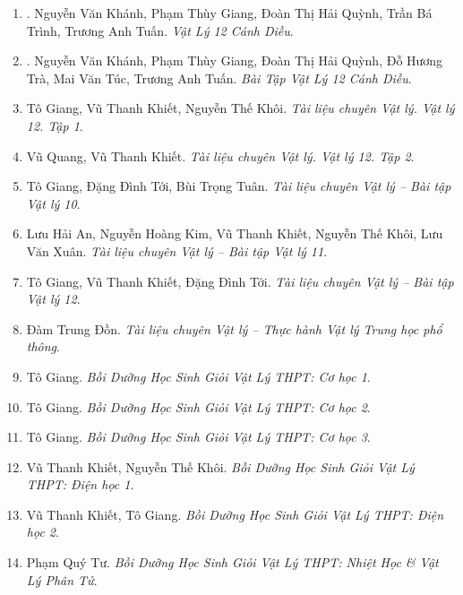 \documentclass{article}
\begin{document}
\begin{enumerate}
	\item \cite{SGK_Vat_Ly_12_CD}. {\sc Nguyễn Văn Khánh, Phạm Thùy Giang, Đoàn Thị Hải Quỳnh, Trần Bá Trình, Trương Anh Tuấn}. {\it Vật Lý 12 Cánh Diều}.\hfill{\sf[done]}

	\item \cite{SBT_Vat_Ly_12_CD}. {\sc Nguyễn Văn Khánh, Phạm Thùy Giang, Đoàn Thị Hải Quỳnh, Đỗ Hương Trà, Mai Văn Túc, Trương Anh Tuấn}. {\it Bài Tập Vật Lý 12 Cánh Diều}.\hfill{\sf[done]}

	\item Tô Giang, Vũ Thanh Khiết, Nguyễn Thế Khôi. {\it Tài liệu chuyên Vật lý. Vật lý 12. Tập 1}.

	\item Vũ Quang, Vũ Thanh Khiết. {\it Tài liệu chuyên Vật lý. Vật lý 12. Tập 2}.

	\item Tô Giang, Đặng Đình Tới, Bùi Trọng Tuân. {\it Tài liệu chuyên Vật lý -- Bài tập Vật lý 10}.

	\item Lưu Hải An, Nguyễn Hoàng Kim, Vũ Thanh Khiết, Nguyễn Thế Khôi, Lưu Văn Xuân. {\it Tài liệu chuyên Vật lý -- Bài tập Vật lý 11}.

	\item Tô Giang, Vũ Thanh Khiết, Đặng Đình Tới. {\it Tài liệu chuyên Vật lý -- Bài tập Vật lý 12}.

	\item Đàm Trung Đồn. {\it Tài liệu chuyên Vật lý -- Thực hành Vật lý Trung học phổ thông}.

	\item Tô Giang. {\it Bồi Dưỡng Học Sinh Giỏi Vật Lý THPT: Cơ học 1}.\hfill{\sf[reading]}

	\item Tô Giang. {\it Bồi Dưỡng Học Sinh Giỏi Vật Lý THPT: Cơ học 2}.\hfill{\sf[reading]}

	\item Tô Giang. {\it Bồi Dưỡng Học Sinh Giỏi Vật Lý THPT: Cơ học 3}.\hfill{\sf[reading]}

	\item Vũ Thanh Khiết, Nguyễn Thế Khôi. {\it Bồi Dưỡng Học Sinh Giỏi Vật Lý THPT: Điện học 1}.\hfill{\sf[reading]}

	\item Vũ Thanh Khiết, Tô Giang. {\it Bồi Dưỡng Học Sinh Giỏi Vật Lý THPT: Điện học 2}.\hfill{\sf[reading]}

	\item Phạm Quý Tư. {\it Bồi Dưỡng Học Sinh Giỏi Vật Lý THPT: Nhiệt Học \& Vật Lý Phân Tử}.


\end{enumerate}
\end{document}
